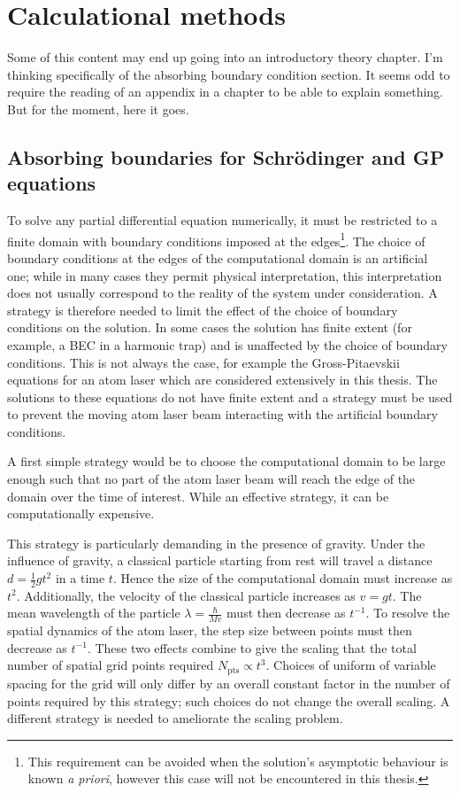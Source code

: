 \chapter{Calculational methods}
\label{MethodsAppendix}
\graphicspath{{Figures/MethodsAppendix/}{Figures/Common/}}

Some of this content may end up going into an introductory theory chapter. I'm thinking specifically of the absorbing boundary condition section. It seems odd to require the reading of an appendix in a chapter to be able to explain something. But for the moment, here it goes.

\section{Absorbing boundaries for Schrödinger and GP equations}

To solve any partial differential equation numerically, it must be restricted to a finite domain with boundary conditions imposed at the edges\footnote{This requirement can be avoided when the solution's asymptotic behaviour is known \emph{a priori}, however this case will not be encountered in this thesis.}. The choice of boundary conditions at the edges of the computational domain is an artificial one; while in many cases they permit physical interpretation, this interpretation does not usually correspond to the reality of the system under consideration. A strategy is therefore needed to limit the effect of the choice of boundary conditions on the solution.  In some cases the solution has finite extent (for example, a BEC in a harmonic trap) and is unaffected by the choice of boundary conditions.  This is not always the case, for example the Gross-Pitaevskii equations for an atom laser which are considered extensively in this thesis.  The solutions to these equations do not have finite extent and a strategy must be used to prevent the moving atom laser beam interacting with the artificial boundary conditions.

A first simple strategy would be to choose the computational domain to be large enough such that no part of the atom laser beam will reach the edge of the domain over the time of interest. While an effective strategy, it can be computationally expensive.

This strategy is particularly demanding in the presence of gravity. Under the influence of gravity, a classical particle starting from rest will travel a distance $d = \frac{1}{2}g t^2$ in a time $t$. Hence the size of the computational domain must increase as $t^2$. Additionally, the velocity of the classical particle increases as $v = gt$. The mean wavelength of the particle $\displaystyle \lambda = \frac{\hbar}{Mv}$ must then decrease as $t^{-1}$. To resolve the spatial dynamics of the atom laser, the step size between points must then decrease as $t^{-1}$. These two effects combine to give the scaling that the total number of spatial grid points required $N_\text{pts} \propto t^3$. Choices of uniform of variable spacing for the grid will only differ by an overall constant factor in the number of points required by this strategy; such choices do not change the overall scaling. A different strategy is needed to ameliorate the scaling problem.

